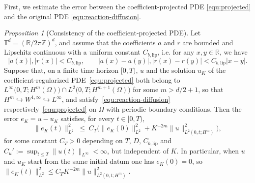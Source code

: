 \documentclass[a4paper,fleqn]{cas-sc}
\theoremstyle{definition}
\theoremstyle{remark}
\newtheorem{proposition}{Proposition}
\begin{document}
First, we estimate the error between the coefficient-projected PDE \eqref{equ:projected} and the original PDE \eqref{equ:reaction-diffusion}.
\begin{proposition}[Consistency of the coefficient-projected PDE]
\label{prop:u_u_K}
Let $\mathbb{T}^d = (\mathbb{R}/2\pi\mathbb{Z})^d$, and assume that the coefficients $a$ and $r$ are bounded and Lipschitz continuous with a uniform constant $C_{b,\mathrm{lip}}$, i.e. for any $x, y\in \mathbb R$, we have
    \[
    |a(x)|,|r(x)| < C_{b,\mathrm{lip}}, \qquad |a(x)-a(y)|,|r(x)-r(y)| < C_{b,\mathrm{lip}} |x-y|.
    \]
    Suppose that, on a finite time horizon $[0,T)$, $u$ and the solution $u_K$ of the
coefficient-regularized PDE~\eqref{equ:projected} both belong to
$L^\infty\bigl(0,T;H^m(\Omega)\bigr)\cap L^2\bigl(0,T;H^{m+1}(\Omega)\bigr)$ for some $m>d/2+1$, so that
$H^m\hookrightarrow W^{1,\infty}\hookrightarrow L^\infty$, and satisfy~\eqref{equ:reaction-diffusion}
respectively~\eqref{equ:projected} on $\Omega$ with periodic boundary conditions. Then the error
$e_K=u- u_K$ satisfies, for every $t\in[0,T)$,
\[
\|e_K(t)\|_{L^2}^2 \;\le\; C_T\Big(\|e_K(0)\|_{L^2}^2 + K^{-2m}\|u\|_{L^2(0,t;H^m)}^2\Big),
\]
for some constant $C_T>0$ depending on $T$, $D$, $C_{b,\mathrm{lip}}$ and
$C_u':=\sup_{t\le T}\|u(t)\|_{L^\infty}<\infty$, but independent of $K$. In particular, when $u$ and
$u_K$ start from the same initial datum one has $e_K(0)=0$, so $\|e_K(t)\|_{L^2}^2\le C_T K^{-2m}\|u\|_{L^2(0,t;H^m)}^2$.
\end{proposition}
\end{document}
